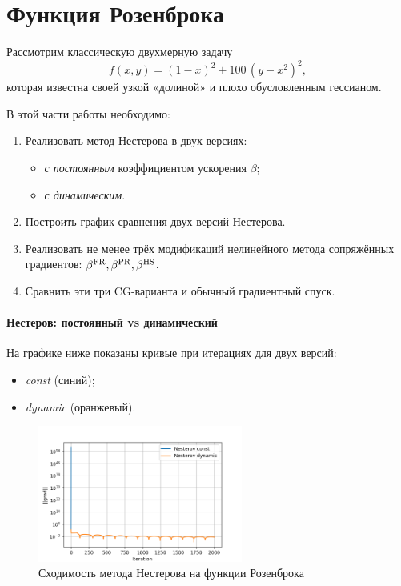 \documentclass[a4paper]{article}
\begin{document}
\section{Функция Розенброка}

Рассмотрим классическую двухмерную задачу
\[
f(x,y) = (1 - x)^2 + 100\,(y - x^2)^2,
\]
которая известна своей узкой «долиной» и плохо обусловленным гессианом.

В этой части работы необходимо:
\begin{enumerate}
  \item Реализовать метод Нестерова в двух версиях:
    \begin{itemize}
      \item \emph{с постоянным} коэффициентом ускорения \(\beta\);
      \item \emph{с динамическим}.
    \end{itemize}
  \item Построить график сравнения двух версий Нестерова.
  \item Реализовать не менее трёх модификаций нелинейного метода сопряжённых градиентов:
    \(\beta^{\rm FR}, \beta^{\rm PR}, \beta^{\rm HS}\).
  \item Сравнить эти три CG-варианта и обычный градиентный спуск.
\end{enumerate}

\paragraph{Нестеров: постоянный vs динамический}  
На графике ниже показаны кривые при итерациях для двух версий:
\begin{itemize}
  \item \emph{const} (синий);
  \item \emph{dynamic} (оранжевый).
\end{itemize}

\begin{figure}[H]
  \centering
  \includegraphics[width=0.6\textwidth]{images/task3_nesterov_comp.png}
  \caption{Сходимость метода Нестерова на функции Розенброка}
\end{figure}
\end{document}
